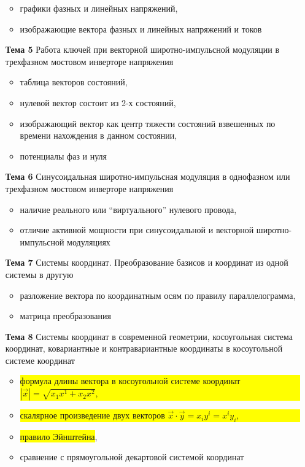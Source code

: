 \begin{itemize}
\begin{itemize}
   \item графики фазных и линейных напряжений,
   \item изображающие вектора фазных и линейных напряжений и токов
  \end{itemize}
\item[\bf{Тема 5}]{Работа ключей при векторной широтно-импульсной модуляции в трехфазном мостовом инверторе напряжения}
  \begin{itemize}
   \item таблица векторов состояний,
   \item нулевой вектор состоит из 2-х состояний,
   \item изображающий вектор как центр тяжести состояний взвешенных по времени нахождения в данном состоянии,
   \item потенциалы фаз и нуля
  \end{itemize}
\item[\bf{Тема 6}]{Синусоидальная широтно-импульсная модуляция в однофазном или трехфазном мостовом инверторе напряжения}
   \begin{itemize}
    \item наличие реального или \enquote{виртуального} нулевого провода,
    \item отличие активной мощности при синусоидальной и векторной широтно-импульсной модуляциях
  \end{itemize}
\item[\bf{Тема 7}]{Системы координат. Преобразование базисов и координат из одной системы в другую}
  \begin{itemize}
   \item разложение вектора по координатным осям по правилу параллелограмма,
   \item матрица преобразования
 \end{itemize}
\item[\bf{Тема 8}]{Системы координат в современной геометрии, косоугольная система координат, ковариантные и контравариантные координаты в косоугольной системе координат}
  \begin{itemize}
   \item \colorbox{yellow}{\parbox[t]{0.9\textwidth}{формула длины вектора в косоугольной системе координат $|\vec{x}|=\sqrt{x_1x^1 + x_2x^2}$,}}
   \item \colorbox{yellow}{\parbox[t]{0.85\textwidth}{скалярное произведение двух векторов $\vec{x}\cdot\vec{y} = x_iy^i =  x^iy_i$,}}
   \item \colorbox{yellow}{правило Эйнштейна},
   \item сравнение с прямоугольной декартовой системой координат

\end{itemize}
\end{itemize}
